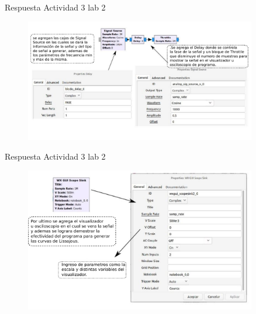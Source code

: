 \begin{frame}{Respuesta Actividad 3 lab 2}
\begin{figure}[H]
	\vspace{-3mm}
	\centering
	\includegraphics[width=0.9\textwidth]{soluciones/actividad-2-2/pdf/Rlab2_3_2.pdf}
\end{figure}
\end{frame}

\begin{frame}{Respuesta Actividad 3 lab 2}
\begin{figure}[H]
	\vspace{-3mm}
	\centering
	\includegraphics[width=0.9\textwidth]{soluciones/actividad-2-2/pdf/Rlab2_3_3.pdf}
\end{figure}
\end{frame}

